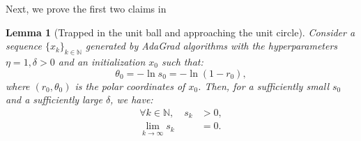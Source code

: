 \documentclass{article}
\theoremstyle{plain}
\newtheorem{lemma}[theorem]{Lemma}
\theoremstyle{definition}
\theoremstyle{remark}
\newcommand*{\NN}{\mathbb{N}}
\begin{document}
Next, we prove the first two claims in 
\begin{lemma}[Trapped in the unit ball and approaching the unit circle]
    \label{lemma:trapping-approaching}
    Consider a sequence $\{x_k\}_{k \in \NN}$ generated by AdaGrad algorithms with the hyperparameters $\eta = 1, \delta > 0$ and an initialization $x_0$ such that:
    \begin{equation*}
        \theta_0 = - \ln s_0 = - \ln (1 - r_0), 
    \end{equation*}
    where $(r_0, \theta_0)$ is the polar coordinates of $x_0$.
    Then, for a sufficiently small $s_0$ and a sufficiently large $\delta$, we have:
    \begin{equation*}
        \begin{aligned}
             \forall k \in \NN, \quad s_k &> 0,\\
            \lim_{k \to \infty} s_k &= 0.\\
        \end{aligned}
    \end{equation*}
\end{lemma}
\end{document}
